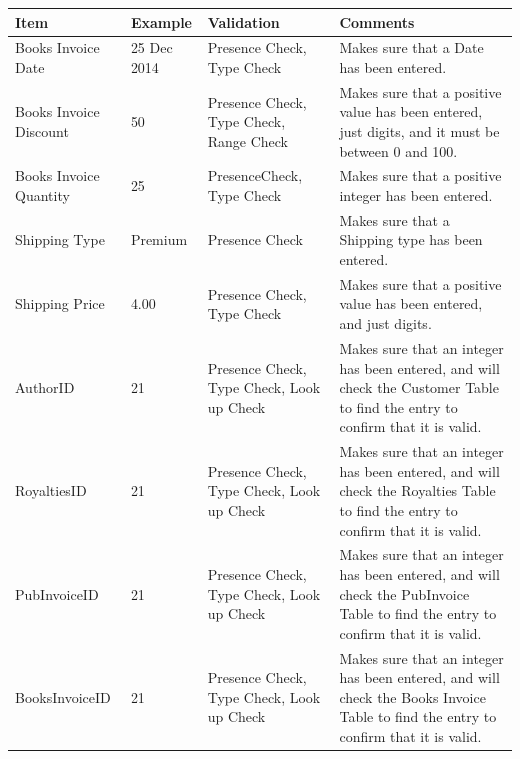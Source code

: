\begin{center}
    \begin{tabular}{|p{2.5cm}|p{2cm}|p{2cm}|p{3.5cm}|}
    \textbf{Item} & \textbf{Example} & \textbf{Validation} & \textbf{Comments}\\ \hline
    Books Invoice Date & 25 Dec 2014 & Presence Check, Type Check & Makes sure that a Date has been entered. \\ \hline
    Books Invoice Discount & 50 & Presence Check, Type Check, Range Check & Makes sure that a positive value has been entered, just digits, and it must be between 0 and 100. \\ \hline
    Books Invoice Quantity & 25 & PresenceCheck, Type Check & Makes sure that a positive integer has been entered. \\ \hline
    Shipping Type & Premium & Presence Check & Makes sure that a Shipping type has been entered. \\ \hline
    Shipping Price & 4.00 & Presence Check, Type Check & Makes sure that a positive value has been entered, and just digits. \\ \hline
    AuthorID & 21 & Presence Check, Type Check, Look up Check & Makes sure that an integer has been entered, and will check the Customer Table to find the entry to confirm that it is valid. \\ \hline 
    RoyaltiesID & 21 & Presence Check, Type Check, Look up Check & Makes sure that an integer has been entered, and will check the Royalties Table to find the entry to confirm that it is valid. \\ \hline
    PubInvoiceID & 21 & Presence Check, Type Check, Look up Check & Makes sure that an integer has been entered, and will check the PubInvoice Table to find the entry to confirm that it is valid. \\ \hline
    BooksInvoiceID & 21 & Presence Check, Type Check, Look up Check & Makes sure that an integer has been entered, and will check the Books Invoice Table to find the entry to confirm that it is valid. \\ \hline
\end{tabular}
\end{center}




